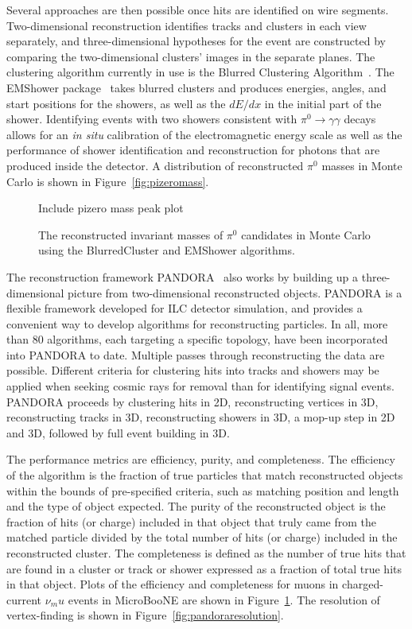 Several approaches are then possible once hits are identified on wire
segments.  Two-dimensional reconstruction identifies tracks and
clusters in each view separately, and three-dimensional hypotheses for
the event are constructed by comparing the two-dimensional clusters'
images in the separate planes.  The clustering algorithm currently in
use is the Blurred Clustering Algorithm~\cite{blurredclustering}.  The
EMShower package~\cite{emshowerpackage} takes blurred clusters and
produces energies, angles, and start positions for the showers, as
well as the $dE/dx$ in the initial part of the shower.  Identifying
events with two showers consistent with $\pi^0\rightarrow\gamma\gamma$
decays allows for an {\it in situ} calibration of the electromagnetic
energy scale as well as the performance of shower identification and
reconstruction for photons that are produced inside the detector.  A
distribution of reconstructed $\pi^0$ masses in Monte Carlo is shown
in Figure~\ref{fig:pizeromass}.

\begin{figure}[htb]
\centering
Include pizero mass peak plot
\caption{The reconstructed invariant masses of $\pi^0$ candidates in
  Monte Carlo using the BlurredCluster and EMShower algorithms.  }
\label{fig:muonpandoraperf}
\end{figure}

The reconstruction framework PANDORA~\cite{pandora} also works by
building up a three-dimensional picture from two-dimensional
reconstructed objects.  PANDORA is a flexible framework developed for
ILC detector simulation, and provides a convenient way to develop
algorithms for reconstructing particles.  In all, more than 80
algorithms, each targeting a specific topology, have been incorporated
into PANDORA to date.  Multiple passes through reconstructing the data
are possible.  Different criteria for clustering hits into tracks and
showers may be applied when seeking cosmic rays for removal than for
identifying signal events.  PANDORA proceeds by clustering hits in 2D,
reconstructing vertices in 3D, reconstructing tracks in 3D,
reconstructing showers in 3D, a mop-up step in 2D and 3D, followed by
full event building in 3D.

The performance metrics are efficiency, purity, and completeness.  The
efficiency of the algorithm is the fraction of true particles that
match reconstructed objects within the bounds of pre-specified
criteria, such as matching position and length and the type of object
expected.  The purity of the reconstructed object is the fraction of
hits (or charge) included in that object that truly came from the
matched particle divided by the total number of hits (or charge)
included in the reconstructed cluster.  The completeness is defined as
the number of true hits that are found in a cluster or track or shower
expressed as a fraction of total true hits in that object.  Plots of
the efficiency and completeness for muons in charged-current $\nu_mu$
events in MicroBooNE are shown in Figure~\ref{fig:muonpandoraperf}.
The resolution of vertex-finding is shown in
Figure~\ref{fig:pandoraresolution}.


